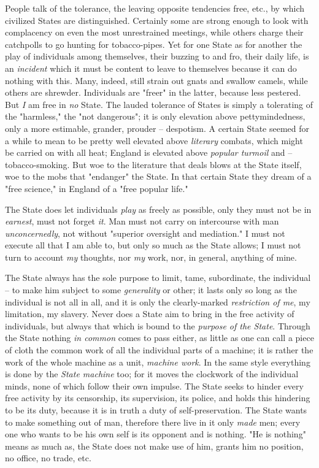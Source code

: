 People talk of the tolerance, the leaving opposite tendencies free, etc., by 
which civilized States are distinguished. Certainly some are strong enough to 
look with complacency on even the most unrestrained meetings, while others 
charge their catchpolls to go hunting for tobacco-pipes. Yet for one State as 
for another the play of individuals among themselves, their buzzing to and 
fro, their daily life, is an \textit{incident} which it must be content to 
leave to themselves because it can do nothing with this. Many, indeed, still 
strain out gnats and swallow camels, while others are shrewder. Individuals 
are "{}freer"{} in the latter, because less pestered. But \textit{I} am free 
in \textit{no} State. The lauded tolerance of States is simply a tolerating of 
the "{}harmless,"{} the "{}not dangerous"{}; it is only elevation above 
pettymindedness, only a more estimable, grander, prouder -- despotism. A 
certain State seemed for a while to mean to be pretty well elevated above 
\textit{literary} combats, which might be carried on with all heat; England is 
elevated above \textit{popular turmoil} and -- tobacco-smoking. But woe to the 
literature that deals blows at the State itself, woe to the mobs that 
"{}endanger"{} the State. In that certain State they dream of a "{}free 
science,"{} in England of a "{}free popular life."{}

The State does let individuals \textit{play} as freely as possible, only they 
must not be in \textit{earnest}, must not forget \textit{it}. Man must not 
carry on intercourse with man \textit{unconcernedly}, not without "{}superior 
oversight and mediation."{} I must not execute all that I am able to, but only 
so much as the State allows; I must not turn to account \textit{my} thoughts, 
nor \textit{my} work, nor, in general, anything of mine.

The State always has the sole purpose to limit, tame, subordinate, the 
individual -- to make him subject to some \textit{generality} or other; it 
lasts only so long as the individual is not all in all, and it is only the 
clearly-marked \textit{restriction of me}, my limitation, my slavery. Never 
does a State aim to bring in the free activity of individuals, but always that 
which is bound to the \textit{purpose of the State}. Through the State nothing 
\textit{in common} comes to pass either, as little as one can call a piece of 
cloth the common work of all the individual parts of a machine; it is rather 
the work of the whole machine as a unit, \textit{machine work}. In the same 
style everything is done by the \textit{State machine} too; for it moves the 
clockwork of the individual minds, none of which follow their own impulse. The 
State seeks to hinder every free activity by its censorship, its supervision, 
its police, and holds this hindering to be its duty, because it is in truth a 
duty of self-preservation. The State wants to make something out of man, 
therefore there live in it only \textit{made} men; every one who wants to be 
his own self is its opponent and is nothing. "{}He is nothing"{} means as much 
as, the State does not make use of him, grants him no position, no office, no 
trade, etc.


